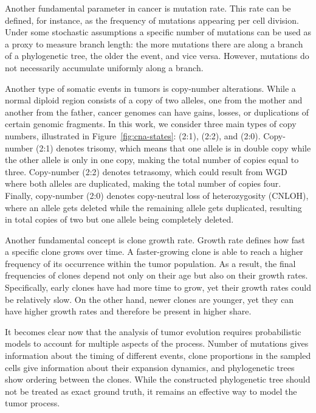 Another fundamental parameter in cancer is mutation rate. This rate can be defined, for instance, as the frequency of mutations appearing per cell division. Under some stochastic assumptions a specific number of mutations can be used as a proxy to measure branch length: the more mutations there are along a branch of a phylogenetic tree, the older the event, and vice versa. However, mutations do not necessarily accumulate uniformly along a branch.

Another type of somatic events in tumors is copy-number alterations. While a normal diploid region consists of a copy of two alleles, one from the mother and another from the father, cancer genomes can have gains, losses, or duplications of certain genomic fragments. In this work, we consider three main types of copy numbers, illustrated in Figure~\ref{fig:cna-states}: (2:1), (2:2), and (2:0). Copy-number (2:1) denotes trisomy, which means that one allele is in double copy while the other allele is only in one copy, making the total number of copies equal to three. Copy-number (2:2) denotes tetrasomy, which could result from WGD where both alleles are duplicated, making the total number of copies four. Finally, copy-number (2:0) denotes copy-neutral loss of heterozygosity (CNLOH), where an allele gets deleted while the remaining allele gets duplicated, resulting in total copies of two but one allele being completely deleted.

Another fundamental concept is clone growth rate. Growth rate defines how fast a specific clone grows over time. A faster-growing clone is able to reach a higher frequency of its occurrence within the tumor population. As a result, the final frequencies of clones depend not only on their age but also on their growth rates. Specifically, early clones have had more time to grow, yet their growth rates could be relatively slow. On the other hand, newer clones are younger, yet they can have higher growth rates and therefore be present in higher share. 

It becomes clear now that the analysis of tumor evolution requires probabilistic models to account for multiple aspects of the process. Number of mutations gives information about the timing of different events, clone proportions in the sampled cells give information about their expansion dynamics, and phylogenetic trees show ordering between the clones. While the constructed phylogenetic tree should not be treated as exact ground truth, it remains an effective way to model the tumor process.
\newcommand{\allelebar}[3]{\draw[fill=#3,draw=#3!65!black,line width=.4pt,rounded corners=2pt] (#1,#2) rectangle ++(0.5,2.0);}
\newcommand{\muttri}[3]{\fill[#3] (#1-0.18,#2+0.12) -- (#1-0.18,#2-0.12) -- (#1,#2) -- cycle;}
\newcommand{\timetri}[2]{\fill[#2] (#1-0.12,2.66) -- (#1+0.12,2.66) -- (#1,2.44) -- cycle;}

